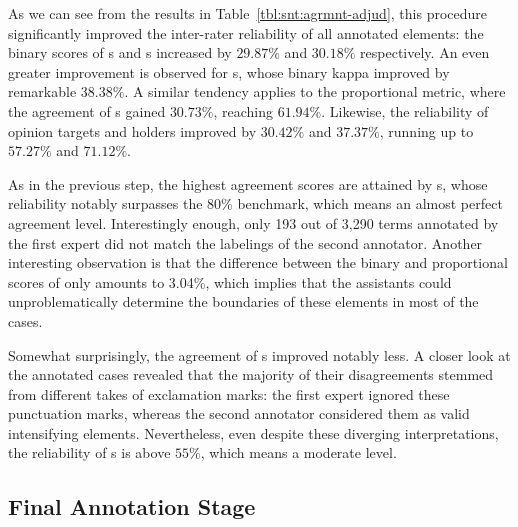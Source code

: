 As we can see from the results in Table~\ref{tbl:snt:agrmnt-adjud},
this procedure significantly improved the inter-rater reliability of
all annotated elements: the binary scores of s and
s increased by $29.87\%$ and $30.18\%$ respectively.
An even greater improvement is observed for s, whose
binary kappa improved by remarkable $38.38\%$.  A similar tendency
applies to the proportional metric, where the agreement of
s gained $30.73\%$, reaching $61.94\%$.  Likewise,
the reliability of opinion targets and holders improved by $30.42\%$
and $37.37\%$, running up to $57.27\%$ and $71.12\%$.



As in the previous step, the highest agreement scores are attained by
s, whose reliability notably surpasses the 80\%
benchmark, which means an almost perfect agreement level.
Interestingly enough, only 193 out of 3,290 terms annotated by the
first expert did not match the labelings of the second annotator.
Another interesting observation is that the difference between the
binary and proportional scores of  only amounts
to 3.04\%, which implies that the assistants could unproblematically
determine the boundaries of these elements in most of the cases.

Somewhat surprisingly, the agreement of s
improved notably less.  A closer look at the annotated cases revealed
that the majority of their disagreements stemmed from different takes
of exclamation marks: the first expert ignored these punctuation
marks, whereas the second annotator considered them as valid
intensifying elements.  Nevertheless, even despite these diverging
interpretations, the reliability of s is above
$55\%$, which means a moderate level.

\subsection{Final Annotation Stage}\label{subsec:eval-final-annotation}


